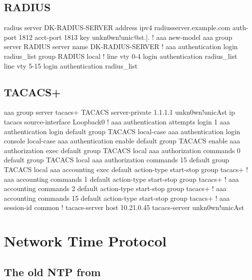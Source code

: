 \documentclass[a4paper,12pt,twoside,twocolumn,landscape]{book}
\begin{document}
\newpage

\section{RADIUS}


\begin{txt}
radius server DK-RADIUS-SERVER
 address ipv4 radiusserver.example.com auth-port 1812 acct-port 1813
 key unkn0wn!unic@st.|.
!
aaa new-model
aaa group server RADIUS
 server name DK-RADIUS-SERVER
!
aaa authentication login radius_list group RADIUS local
!
line vty 0-4
 login authentication radius_list
line vty 5-15
 login authentication radius_list
\end{txt}

\newpage

\section{TACACS+}


\begin{txt}
aaa group server tacacs+ TACACS
server-private 1.1.1.1 unkn0wn!unicAst
ip tacacs source-interface Loopback0
!
aaa authentication attempts login 1
aaa authentication login default group TACACS local-case
aaa authentication login console local-case
aaa authentication enable default group TACACS enable
aaa authorization exec default group TACACS local 
aaa authorization commands 0 default group TACACS local 
aaa authorization commands 15 default group TACACS local 
aaa accounting exec default
 action-type start-stop
 group tacacs+
!
aaa accounting commands 1 default
 action-type start-stop
 group tacacs+
!
aaa accounting commands 2 default
 action-type start-stop
 group tacacs+
!
aaa accounting commands 15 default
 action-type start-stop
 group tacacs+
!
aaa session-id common
!
tacacs-server host 10.21.0.45
tacacs-server unkn0wn!unicAst
\end{txt}


\chapter{Network Time Protocol}

\section{The old NTP from }
\end{document}
